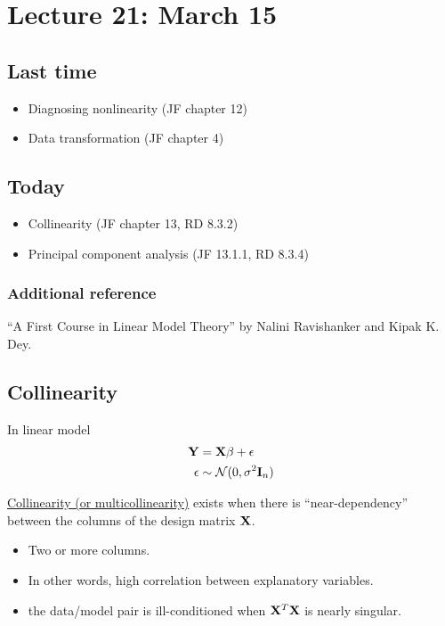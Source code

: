 \setcounter{section}{20}

\section{Lecture 21: March 15}


\subsection*{Last time}
\begin{itemize}
	\item Diagnosing nonlinearity (JF chapter 12)
	\item Data transformation (JF chapter 4)
\end{itemize}


\subsection*{Today}
\begin{itemize}
	\item Collinearity (JF chapter 13, RD 8.3.2)
	\item Principal component analysis (JF 13.1.1, RD 8.3.4)
\end{itemize}

\subsubsection*{Additional reference}
``A First Course in Linear Model Theory'' by Nalini Ravishanker and Kipak K. Dey.

\subsection*{Collinearity}

In linear model
$$
\begin{aligned}
	\mathbf{Y} &= \mathbf{X} \mathbf{\beta} + \mathbf{\epsilon}\\
	\epsilon &\sim \mathcal{N}(0, \sigma^2 \mathbf{I}_n)\\
\end{aligned}
$$

\underline{Collinearity (or multicollinearity)} exists when there is ``near-dependency'' between the columns of the design matrix $\mathbf{X}$.
	\begin{itemize}
	\item Two or more columns.
	\item In other words, high correlation between explanatory variables.
	\item the data/model pair is  ill-conditioned when $\mathbf{X} ^T \mathbf{X}$ is nearly singular.
\end{itemize}

